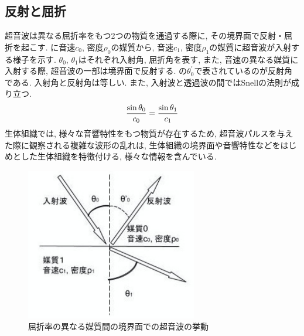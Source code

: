 \subsection{反射と屈折}
超音波は異なる屈折率をもつ2つの物質を通過する際に, その境界面で反射・屈折を起こす.  に音速$c_0$, 密度$\rho_0$の媒質から, 音速$c_1$, 密度$\rho_1$の媒質に超音波が入射する様子を示す. $\theta_0$, $\theta_1$はそれぞれ入射角, 屈折角を表す, また, 音速の異なる媒質に入射する際, 超音波の一部は境界面で反射する. の$\theta_0^{\prime}$で表されているのが反射角である. 入射角と反射角は等しい. また, 入射波と透過波の間ではSnellの法則が成り立つ.
\begin{equation}
\\ \dfrac{\sin\theta_0}{c_0} = \dfrac{\sin\theta_1}{c_1}
\end{equation}
生体組織では, 様々な音響特性をもつ物質が存在するため, 超音波パルスを与えた際に観察される複雑な波形の乱れは, 生体組織の境界面や音響特性などをはじめとした生体組織を特徴付ける, 様々な情報を含んでいる. 
\begin{figure}[H]
  \begin{center}
    \includegraphics[width=75mm]{fig/hansha.pdf}
  \end{center}
  \caption{屈折率の異なる媒質間の境界面での超音波の挙動}
\end{figure}

